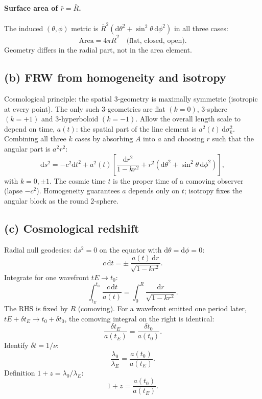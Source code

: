 \documentclass[11pt]{article}
\newcommand{\de}{\mathrm{d}}
\begin{document}
\paragraph{Surface area of $\bar r=\bar R$.}
The induced $(\theta,\phi)$ metric is $\bar R^2(\de\theta^2+\sin^2\theta\,\de\phi^2)$ in all three cases:
\[
\boxed{\;\text{Area} = 4\pi \bar R^2 \quad \text{(flat, closed, open)}.\;}
\]
Geometry differs in the radial part, not in the area element.

\subsection*{(b) FRW from homogeneity and isotropy}

Cosmological principle: the spatial 3-geometry is maximally symmetric (isotropic at every point). The only such 3-geometries are flat $(k=0)$, 3-sphere $(k=+1)$ and 3-hyperboloid $(k=-1)$. Allow the overall length scale to depend on time, $a(t)$: the spatial part of the line element is $a^2(t)\,\de\sigma_k^2$. Combining all three $k$ cases by absorbing $A$ into $a$ and choosing $r$ such that the angular part is $a^2 r^2$:
\[
\de s^2 = -c^2\de t^2 + a^2(t)\!\left[\frac{\de r^2}{1-k r^2} + r^2(\de\theta^2 + \sin^2\theta\,\de\phi^2)\right],
\]
with $k=0,\pm 1$. The cosmic time $t$ is the proper time of a comoving observer (lapse $-c^2$). Homogeneity guarantees $a$ depends only on $t$; isotropy fixes the angular block as the round 2-sphere.

\subsection*{(c) Cosmological redshift}

Radial null geodesics: $\de s^2=0$ on the equator with $\de\theta=\de\phi=0$:
\[
c\,\de t = \pm\,\frac{a(t)\,\de r}{\sqrt{1-k r^2}}.
\]
Integrate for one wavefront $tE\to t_0$:
\[
\int_{t_E}^{t_0}\frac{c\,\de t}{a(t)} = \int_0^R\frac{\de r}{\sqrt{1-k r^2}}.
\]
The RHS is fixed by $R$ (comoving). For a wavefront emitted one period later, $tE+\delta t_E\to t_0+\delta t_0$, the comoving integral on the right is identical:
\[
\frac{\delta t_E}{a(t_E)} = \frac{\delta t_0}{a(t_0)}.
\]
Identify $\delta t = 1/\nu$:
\[
\frac{\lambda_0}{\lambda_E} = \frac{a(t_0)}{a(t_E)}.
\]
Definition $1+z = \lambda_0/\lambda_E$:
\begin{equation}
\boxed{\;1 + z = \frac{a(t_0)}{a(t_E)}.\;}
\label{eq:1plusz}
\end{equation}
\end{document}
